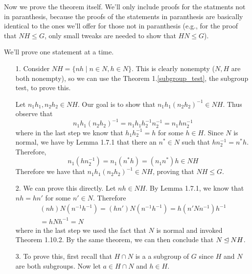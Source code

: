     Now we prove the theorem itself. We'll only include proofs for the
    statments not in paranthesis, because the proofs of the statements in paranthesis
    are basically identical to the ones we'll offer for those not in
    paranthesis (e.g., for the proof that $NH \le G$, only small
    tweaks are needed to show that $HN \le G$).
    \begin{prf}
        We'll prove one statement at a time. 

        \begin{itemize}
            \item[1.] \textcolor{NavyBlue}{Consider $NH = \{nh \mid n \in N, h
            \in N\}$. This is clearly nonempty ($N, H$ are both
            nonempty), so we can use the Theorem
            1.\ref{subgroup_test}, the subgroup test, to prove this.}

            Let $n_1h_1, n_2h_2 \in NH$. Our goal is to show that
            $n_1h_1(n_2h_2)^{-1} \in NH$. Thus observe that 
            \[
                n_1h_1(n_2h_2)^{-1} = n_1h_1h_2^{-1}n_2^{-1} = n_1hn_2^{-1}
            \]
            where in the last step we know that $h_1h_2^{-1} = h$ for
            some $h \in H$. 
            Since $N$ is normal, we have by Lemma 1.7.1 that there
            an $n^* \in N$ such that $hn_2^{-1} = n^*h$. Therefore,
            \[
                n_1(hn_2^{-1}) = n_1(n^*h) = (n_1n^*)h \in NH
            \]
            Therefore we have that
            $n_1h_1(n_2h_2)^{-1} \in NH$, proving that $NH \le G$.
            
            \item[2.] \textcolor{NavyBlue}{We can prove this directly.} Let $nh \in
            NH$. By Lemma 1.7.1, we know that $nh = hn'$ for some $n'
            \in N$. Therefore 
            \begin{align*}
                (nh)N(n^{-1}h^{-1}) = (hn')N(n^{-1}h^{-1})
                = h(n'Nn^{-1})h^{-1}\\ = hNh^{-1} = N
            \end{align*}
            where in the last step we used the fact that $N$ is normal
            and invoked Theorem 1.10.2. By the same theorem, we can
            then conclude that $N \unlhd NH$.

            \item[3.] \textcolor{NavyBlue}{To prove this, first recall that $H \cap N$ is a
            a subgroup of $G$ since $H$ and $N$ are both subgroups.}
            Now let $a \in H \cap N$ and $h \in H$. 
            

\end{itemize}
\end{prf}
